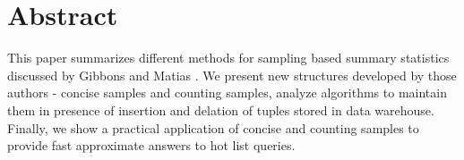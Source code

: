 \section{Abstract}
This paper summarizes different methods for sampling based summary
statistics discussed by Gibbons and Matias
\cite{GM98}. We present new structures developed by
those authors - concise samples and counting samples, analyze algorithms to
maintain them in presence of insertion and delation of tuples
stored in data warehouse.  Finally, we show a practical application
of concise and counting samples to provide fast approximate answers
to hot list queries.

